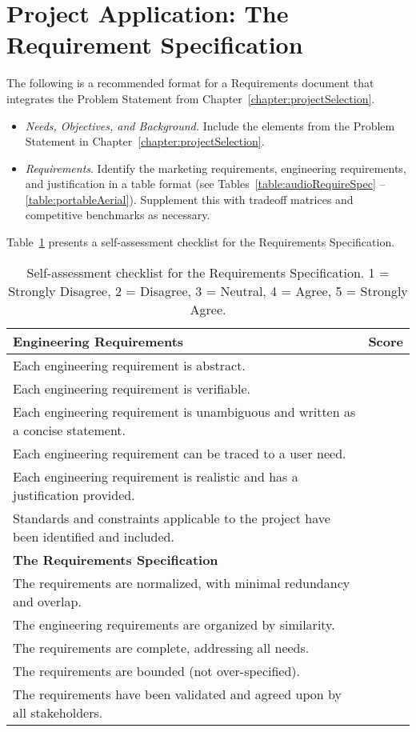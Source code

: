 \section{Project Application: The Requirement Specification}
\label{section:project-application-the-requirements-specification}

The following is a recommended format for a Requirements document that
integrates the Problem Statement from Chapter~\ref{chapter:projectSelection}.

\begin{itemize}
\item
  \emph{Needs, Objectives, and Background.} Include the elements from
  the Problem Statement in Chapter~\ref{chapter:projectSelection}.
\item
  \emph{Requirements}. Identify the marketing requirements, engineering
  requirements, and justification in a table format (see Tables~\ref{table:audioRequireSpec} --
  \ref{table:portableAerial}). Supplement this with tradeoff matrices and competitive
  benchmarks as necessary.
\end{itemize}

Table~\ref{table:requirementsCheckList} presents a self-assessment checklist for the Requirements
 Specification.
  
\begin{table}[h]
\centering
\caption{Self-assessment checklist for the Requirements
Specification. 1 = Strongly Disagree, 2 = Disagree, 3 = Neutral, 4 =
Agree, 5 = Strongly Agree.}

\label{table:requirementsCheckList}
\begin{tabular}{ |p{10cm}|l|} 
\hline
\rowcolor{Gray}
\textbf{Engineering Requirements} & \textbf{Score}\\ \hline
Each engineering requirement is abstract. & \\ \hline
Each engineering requirement is verifiable. & \\ \hline
Each engineering requirement is unambiguous and written as a concise
statement. & \\ \hline
Each engineering requirement can be traced to a user need. & \\ \hline
Each engineering requirement is realistic and has a justification
provided. & \\ \hline
Standards and constraints applicable to the project have been identified
and included. & \\ \hline

\rowcolor{Gray}
\textbf{The Requirements Specification} & \\ \hline
The requirements are normalized, with minimal redundancy and overlap.
& \\ \hline
The engineering requirements are organized by similarity. & \\ \hline
The requirements are complete, addressing all needs. & \\ \hline
The requirements are bounded (not over-specified). & \\ \hline
The requirements have been validated and agreed upon by all
stakeholders. & \\ \hline
\end{tabular}
\end{table}

